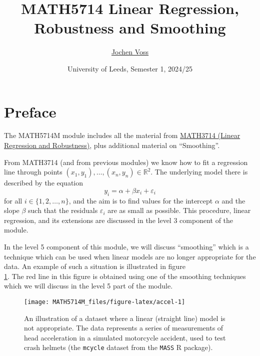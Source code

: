 \documentclass[
  a4paper,
]{article}
\title{MATH5714 Linear Regression, Robustness and Smoothing}
\author{\href{mailto:J.Voss@leeds.ac.uk}{Jochen Voss}}
\date{University of Leeds, Semester 1, 2024/25}
\theoremstyle{definition}
\theoremstyle{definition}
\theoremstyle{definition}
\theoremstyle{definition}
\theoremstyle{remark}
\begin{document}
\maketitle

{
\setcounter{tocdepth}{2}
\tableofcontents
}
\newcommand{\argmin}{\mathop{\mathrm{arg\,min}}\limits}
\newcommand{\bias}{\mathop{\mathrm{bias}}}
\newcommand{\CN}{\mathcal{N}}
\newcommand{\CU}{\mathcal{U}}
\newcommand{\downto}{\downarrow}
\newcommand{\ds}{\displaystyle}
\newcommand{\E}{\mathbb{E}}
\newcommand{\eps}{\varepsilon}
\newcommand{\MSE}{\mathop{\mathrm{MSE}}\nolimits}
\newcommand{\N}{\mathbb{N}}
\renewcommand{\phi}{\varphi}
\newcommand{\R}{\mathbb{R}}
\newcommand{\Var}{\mathop{\mathrm{Var}}}

\section*{Preface}\label{home}

The MATH5714M module includes all the material from \href{https://seehuhn.github.io/MATH3714/}{MATH3714 (Linear
Regression and Robustness)}, plus
additional material on ``Smoothing''.

From MATH3714 (and from previous modules) we know how to fit a regression line through
points \((x_1, y_1), \ldots, (x_n, y_n) \in\mathbb{R}^2\). The underlying model
there is described by the equation
\begin{equation*}
  y_i
  = \alpha + \beta x_i + \varepsilon_i
\end{equation*}
for all \(i \in \{1, 2, \ldots, n\}\), and the aim is to find values for the
intercept \(\alpha\) and the slope \(\beta\) such that the residuals \(\varepsilon_i\) are
as small as possible. This procedure, linear regression, and its extensions
are discussed in the level 3 component of the module.

In the level 5 component of this module, we will discuss ``smoothing'' which is a
technique which can be used when linear models are no longer appropriate for
the data. An example of such a situation is illustrated in figure\\
\ref{fig:accel}. The red line in this figure is obtained using one of the
smoothing techniques which we will discuss in the level 5 part of the module.



\begin{figure}

{\centering \texttt{[image: MATH5714M\_files/figure-latex/accel-1]} 

}

\caption{An illustration of a dataset where a linear (straight line) model is not appropriate. The data represents a series of measurements of head acceleration in a simulated motorcycle accident, used to test crash helmets (the \texttt{mcycle} dataset from the \texttt{MASS} R package).}\label{fig:accel}
\end{figure}
\end{document}
